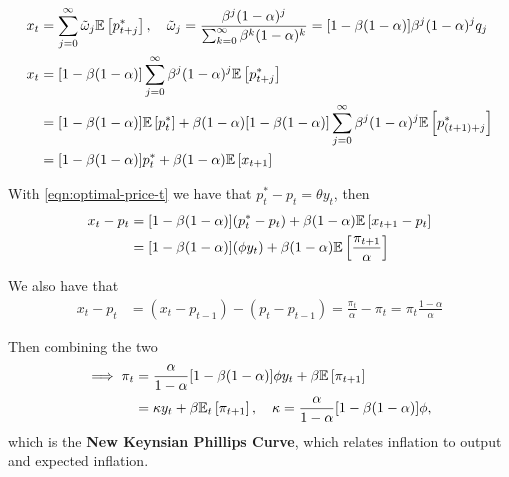 \documentclass[../main.tex]{subfiles}
\begin{document}
        \begin{align}
            x_t
            &= \sum_{j=0}^\infty \tilde\omega_{j} \mathbb{E}\left[p_{t+j}^*\right]
            ,\quad
            \tilde\omega_j
            = \frac{\beta^j (1-\alpha)^j}{\sum_{k=0}^\infty \beta^k (1-\alpha)^k}
            = [1 - \beta(1-\alpha)] \beta^j (1-\alpha)^j q_j
            \\
            x_t
            &= [1 - \beta(1-\alpha)] \sum_{j=0}^\infty \beta^j (1-\alpha)^j \mathbb{E}\left[p_{t+j}^*\right]
            \\
            &= [1 - \beta(1-\alpha)] \mathbb{E}\left[p_{t}^*\right]
            + \beta (1-\alpha) [1 - \beta(1-\alpha)] \sum_{j=0}^\infty \beta^j (1-\alpha)^j \mathbb{E}\left[p_{(t+1)+j}^*\right]
            \\
            &= [1 - \beta(1-\alpha)] p_{t}^*
            + \beta (1-\alpha) \mathbb{E}\left[x_{t+1}\right]
        \end{align}
        
        With \eqref{eqn:optimal-price-t} we have that $p_t^* - p_t = \theta y_t$, then
        \begin{align}
            x_t - p_t
            &= [1 - \beta(1-\alpha)] (p_{t}^* - p_t)
            + \beta (1-\alpha) \mathbb{E}\left[x_{t+1} - p_t\right]
            \\
            &= [1 - \beta(1-\alpha)] (\phi y_t) 
            + \beta (1-\alpha) \mathbb{E}\left[\frac{\pi_{t+1}}{\alpha}\right]
        \end{align}
        
        We also have that
        \begin{align}
            x_t - p_t
            &= (x_t - p_{t-1}) - (p_t - p_{t-1})
            = \frac{\pi_t}{\alpha} - \pi_t
            = \pi_t \frac{1 - \alpha}{\alpha}
        \end{align}
        
        Then combining the two
        \begin{align}
            \implies
            \pi_t
            &=
            \frac{\alpha}{1-\alpha}
            [1 - \beta(1-\alpha)] \phi y_t
            + \beta \mathbb{E}\left[\pi_{t+1}\right]
            \\
            &= \kappa y_t + \beta \mathbb{E}_t\left[\pi_{t+1}\right],
            \quad
            \kappa = \frac{\alpha}{1-\alpha}
            [1 - \beta(1-\alpha)] \phi, \label{eqn:nk-phillips-curve}
        \end{align}
        which is the \textbf{New Keynsian Phillips Curve}, which relates inflation to output and expected inflation.
        
        
    \renewcommand{\thesection}{A\arabic{chapter}}
        
\end{document}
